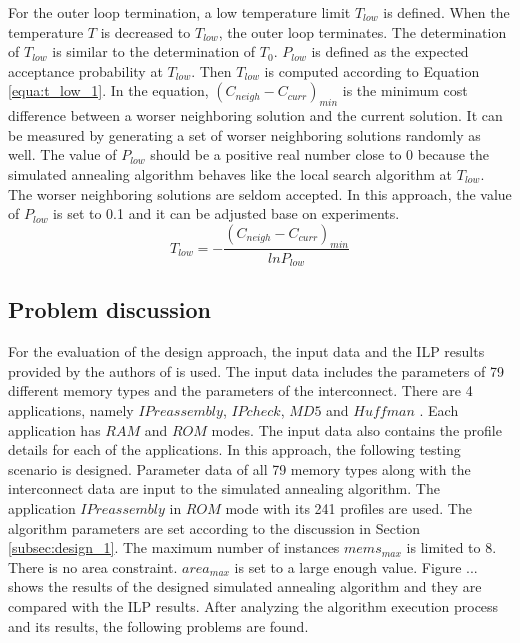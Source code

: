 		For the outer loop termination, a low temperature limit $T_{low}$ is defined.
		When the temperature $T$ is decreased to $T_{low}$, the outer loop terminates.
		The determination of $T_{low}$ is similar to the determination of $T_{0}$.
		$P_{low}$ is defined as the expected acceptance probability at $T_{low}$.
		Then $T_{low}$ is computed according to Equation \ref{equa:t_low_1}.
		In the equation, $\left( C_{neigh}-C_{curr} \right)_{min}$ is the minimum cost
		difference between a worser neighboring solution and the current solution.
		It can be measured by generating a set of worser neighboring solutions randomly
		as well. The value of $P_{low}$ should be a positive real number close to 0
		because the simulated annealing algorithm behaves like the local search algorithm
		at $T_{low}$. The worser neighboring solutions are seldom accepted.
		In this approach, the value of $P_{low}$ is set to 0.1 and it can be adjusted
		base on experiments.
		\begin{equation}
		\label{equa:t_low_1}
			T_{low}= - \frac{\left( C_{neigh}-C_{curr} \right)_{min}}{ln{P_{low}}}
		\end{equation}	
	
		\subsection{Problem discussion}
		\label{subsec:problem_1}
		For the evaluation of the design approach, the input data and the ILP results
		provided by the authors of \cite{Strobel2016} is used.
		The input data includes the parameters of 79 different memory types
		and the parameters of the interconnect.
		There are 4 applications, namely $IP reassembly$, $IP check$, $MD5$ and
		$Huffman$ \cite{Strobel2016}. Each application has $RAM$ and $ROM$ modes.
		The input data also contains the profile details for each of the applications.
		In this approach, the following testing scenario is designed.
		Parameter data of all 79 memory types along with the interconnect
		data are input to the simulated annealing algorithm.
		The application $IP reassembly$ in $ROM$ mode with its 241 profiles are used.
		The algorithm parameters are set according to the discussion in Section
		\ref{subsec:design_1}.
		The maximum number of instances $mems_{max}$ is limited to 8.
		There is no area constraint. $area_{max}$ is set to a large enough value.
		Figure ... shows the results of the designed simulated annealing algorithm
		and they are compared with the ILP results. After analyzing the algorithm
		execution process and its results, the following problems are found.
	
